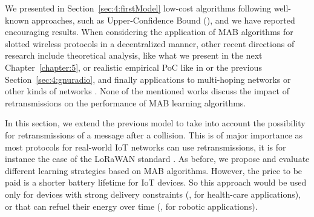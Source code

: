 
\graphicspath{{2-Chapters/4-Chapter/IEEE_WCNC__2019__Paper__BMBM/}}


We presented in Section~\ref{sec:4:firstModel} low-cost algorithms following well-known approaches, such as Upper-Confidence Bound (\UCB), and we have reported encouraging results.
When considering the application of MAB algorithms for slotted wireless protocols in a decentralized manner,
other recent directions of research include theoretical analysis, like what we present in the next Chapter~\ref{chapter:5},
or realistic empirical PoC like in \cite{RobertSDR2014,modiDemo2016,darak2016bayesian,kumar2017channel} or the previous Section~\ref{sec:4:gnuradio},
and finally applications to multi-hoping networks \cite{Mitton16,Toldov16} or other kinds of networks \cite{Azari18,Wilhelmi19collaborative,Wilhelmi19potential}.
%
None of the mentioned works discuss the impact of retransmissions on the performance of MAB learning algorithms.

In this section, we extend the previous model to take into account the possibility for retransmissions of a message after a collision.
This is of major importance as most protocols for real-world IoT networks can use retransmissions, it is for instance the case of the LoRaWAN standard \cite{Raza17}.
As before, we propose and evaluate different learning strategies based on MAB algorithms.
However, the price to be paid is a shorter battery lifetime for IoT devices. So this approach would be used only for devices with strong delivery constraints (\eg, for health-care applications), or that can refuel their energy over time (\eg, for robotic applications).



